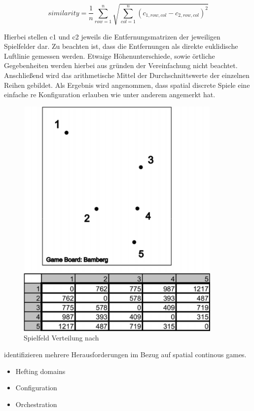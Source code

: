 \begin{equation}
similarity = \frac{1}{n} \sum_{row=1}^{n} \sqrt{ \sum_{col=1}^{n} (c_{1,row,col} - c_{2,row,col})^2 }
\end{equation}

Hierbei stellen c1 und c2 jeweils die Entfernungsmatrizen der jeweiligen Spielfelder dar.
Zu beachten ist, dass die Entfernungen als direkte euklidische Luftlinie gemessen werden. Etwaige Höhenunterschiede, sowie örtliche Gegebenheiten werden hierbei aus gründen der Vereinfachung nicht beachtet. Anschließend wird das arithmetische Mittel der Durchschnittswerte der einzelnen Reihen gebildet.
Als Ergebnis wird angenommen, dass spatial discrete Spiele eine einfache
re Konfiguration erlauben wie unter anderem \cite{Benford.2005} angemerkt hat.

\begin{figure}[H]
\begin{center}
\includegraphics[width=100mm]{images/ch3_img03b_distributed.png}
\caption{Spielfeld Verteilung nach \textcite{Kiefer.2007}}
\label{img:ch03_img02_flow}
\end{center}
\end{figure}

\citep{Benford.2005} identifizieren mehrere Herausforderungen im Bezug auf spatial continous games.

\begin{itemize}
      \item Hefting domains
      \item Configuration
      \item Orchestration
\end{itemize}


